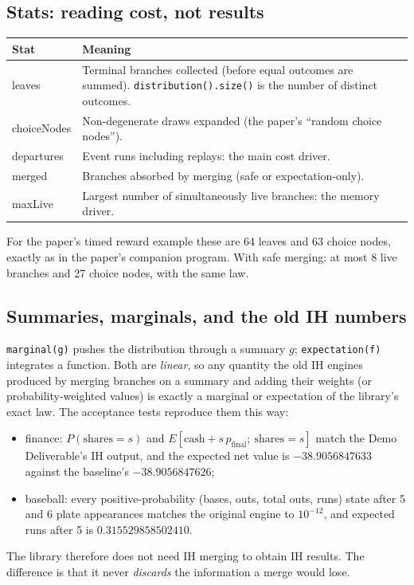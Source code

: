 \documentclass[11pt]{article}
\newcommand{\code}[1]{\texttt{#1}}
\begin{document}
\subsection{Stats: reading cost, not results}
\begin{center}
\small
\begin{tabularx}{\linewidth}{@{}>{\ttfamily}p{2.6cm} Y@{}}
\toprule
\normalfont\textbf{Stat} & \textbf{Meaning}\\
\midrule
leaves & Terminal branches collected (before equal outcomes are summed). \code{distribution().size()} is the number of distinct outcomes.\\
choiceNodes & Non-degenerate draws expanded (the paper's ``random choice nodes'').\\
departures & Event runs including replays: the main cost driver.\\
merged & Branches absorbed by merging (safe or expectation-only).\\
maxLive & Largest number of simultaneously live branches: the memory driver.\\
\bottomrule
\end{tabularx}
\end{center}
For the paper's timed reward example these are 64 leaves and 63 choice nodes, exactly as in the paper's companion
program. With safe merging: at most 8 live branches and 27 choice nodes, with the same law.

\subsection{Summaries, marginals, and the old IH numbers}
\code{marginal(g)} pushes the distribution through a summary $g$; \code{expectation(f)} integrates a function. Both are
\emph{linear}, so any quantity the old IH engines produced by merging branches on a summary and adding their weights (or
probability-weighted values) is exactly a marginal or expectation of the library's exact law. The acceptance tests
reproduce them this way:
\begin{itemize}
\item finance: $P(\text{shares}=s)$ and $E[\text{cash}+s\,p_{\text{final}};\ \text{shares}=s]$ match the Demo
  Deliverable's IH output, and the expected net value is $-38.9056847633$ against the baseline's $-38.9056847626$;
\item baseball: every positive-probability (bases, outs, total outs, runs) state after 5 and 6 plate appearances matches
  the original engine to $10^{-12}$, and expected runs after 5 is $0.315529858502410$.
\end{itemize}
The library therefore does not need IH merging to obtain IH results. The difference is that it never \emph{discards}
the information a merge would lose.
\end{document}
